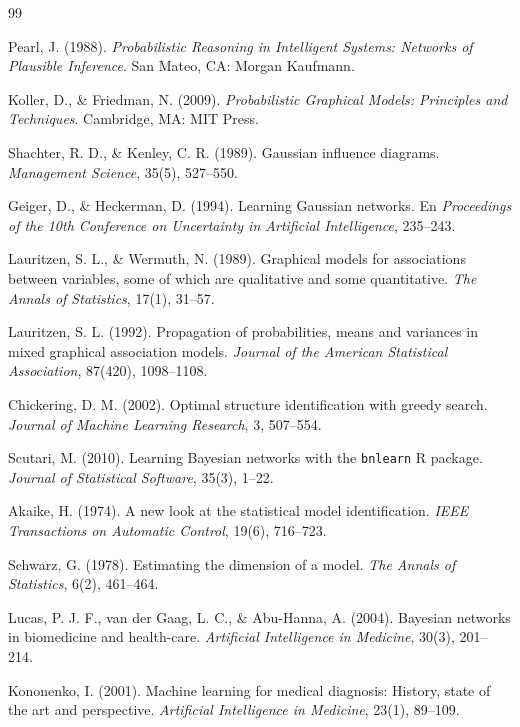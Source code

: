 \documentclass[11pt, a4paper]{article}
\begin{document}
\begin{thebibliography}{99}
\small

 Pearl, J. (1988). \textit{Probabilistic Reasoning in Intelligent Systems:
Networks of Plausible Inference}. San Mateo, CA: Morgan Kaufmann.

 Koller, D., \& Friedman, N. (2009). \textit{Probabilistic Graphical Models:
Principles and Techniques}. Cambridge, MA: MIT Press.

 Shachter, R. D., \& Kenley, C. R. (1989). Gaussian influence diagrams.
\textit{Management Science}, 35(5), 527--550.

 Geiger, D., \& Heckerman, D. (1994). Learning Gaussian networks. En
\textit{Proceedings of the 10th Conference on Uncertainty in Artificial Intelligence}, 235--243.

 Lauritzen, S. L., \& Wermuth, N. (1989). Graphical models for associations
between variables, some of which are qualitative and some quantitative. \textit{The Annals of
Statistics}, 17(1), 31--57.

 Lauritzen, S. L. (1992). Propagation of probabilities, means and variances
in mixed graphical association models. \textit{Journal of the American Statistical Association},
87(420), 1098--1108.

 Chickering, D. M. (2002). Optimal structure identification with greedy
search. \textit{Journal of Machine Learning Research}, 3, 507--554.

 Scutari, M. (2010). Learning Bayesian networks with the \texttt{bnlearn} R
package. \textit{Journal of Statistical Software}, 35(3), 1--22.

 Akaike, H. (1974). A new look at the statistical model identification.
\textit{IEEE Transactions on Automatic Control}, 19(6), 716--723.

 Schwarz, G. (1978). Estimating the dimension of a model. \textit{The Annals
of Statistics}, 6(2), 461--464.

 Lucas, P. J. F., van der Gaag, L. C., \& Abu-Hanna, A. (2004). Bayesian
networks in biomedicine and health-care. \textit{Artificial Intelligence in Medicine}, 30(3),
201--214.

 Kononenko, I. (2001). Machine learning for medical diagnosis: History,
state of the art and perspective. \textit{Artificial Intelligence in Medicine}, 23(1), 89--109.


\end{thebibliography}
\end{document}
